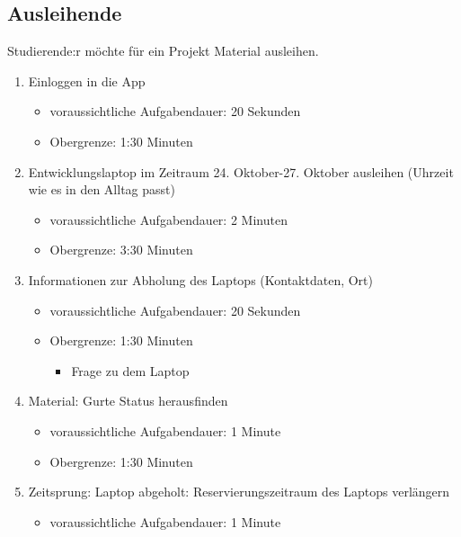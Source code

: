 \subsection{Ausleihende}

{\sffamily\color{maincolor}{Szenario:}} Studierende:r möchte für ein Projekt Material ausleihen.
\begin{enumerate}
    \item Einloggen in die App
            \begin{itemize}
                \item voraussichtliche Aufgabendauer: 20 Sekunden
                \item Obergrenze: 1:30 Minuten
            \end{itemize}
    \item Entwicklungslaptop im Zeitraum 24. Oktober-27. Oktober ausleihen (Uhrzeit wie es in den Alltag passt)
            \begin{itemize}
                \item voraussichtliche Aufgabendauer: 2 Minuten
                \item Obergrenze: 3:30 Minuten
            \end{itemize}
    \item Informationen zur Abholung des Laptops (Kontaktdaten, Ort)
            \begin{itemize}
                \item voraussichtliche Aufgabendauer: 20 Sekunden
                \item Obergrenze: 1:30 Minuten
                \begin{itemize}
                    \item Frage zu dem Laptop
                \end{itemize}
            \end{itemize}
    \item Material: Gurte Status herausfinden
            \begin{itemize}
                \item voraussichtliche Aufgabendauer: 1 Minute
                \item Obergrenze: 1:30 Minuten
            \end{itemize}
    \item Zeitsprung: Laptop abgeholt: Reservierungszeitraum des Laptops verlängern
            \begin{itemize}
                \item voraussichtliche Aufgabendauer: 1 Minute

\end{itemize}
\end{enumerate}
